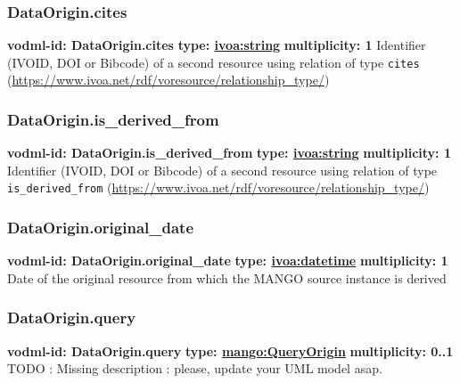     \subsubsection{DataOrigin.cites}
      \textbf{vodml-id: DataOrigin.cites} \newline
      \textbf{type: \hyperref[sect:ivoa]{ivoa:string}} \newline
      \textbf{multiplicity: 1} \newline
      Identifier (IVOID, DOI or Bibcode) of a second resource using relation of type \texttt{cites} (\url{https://www.ivoa.net/rdf/voresource/relationship\_type/})

    \subsubsection{DataOrigin.is\_derived\_from}
      \textbf{vodml-id: DataOrigin.is\_derived\_from} \newline
      \textbf{type: \hyperref[sect:ivoa]{ivoa:string}} \newline
      \textbf{multiplicity: 1} \newline
      Identifier (IVOID, DOI or Bibcode) of a second resource using relation of type \texttt{is\_derived\_from} (\url{https://www.ivoa.net/rdf/voresource/relationship\_type/})

    \subsubsection{DataOrigin.original\_date}
      \textbf{vodml-id: DataOrigin.original\_date} \newline
      \textbf{type: \hyperref[sect:ivoa]{ivoa:datetime}} \newline
      \textbf{multiplicity: 1} \newline
      Date of the original resource from which the MANGO source instance is derived

    \subsubsection{DataOrigin.query}
      \textbf{vodml-id: DataOrigin.query} \newline
      \textbf{type: \hyperref[sect:QueryOrigin]{mango:QueryOrigin}} \newline
      \textbf{multiplicity: 0..1} \newline
      TODO : Missing description : please, update your UML model asap.

